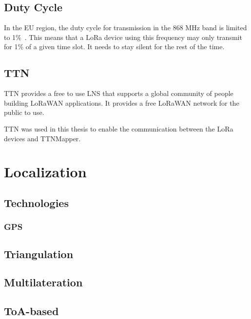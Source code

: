 \subsection{Duty Cycle}


In the \ac{EU} region, the duty cycle for transmission in the 868 MHz band is limited to 1\%~\cite{etsi_etsi_2012}.
This means that a \ac{LoRa} device using this frequency may only transmit for 1\% of a given time slot.
It needs to stay silent for the rest of the time.

\subsection{\acf{TTN}}

\ac{TTN} provides a free to use \ac{LNS} that supports a global community of people building \ac{LoRaWAN} applications.
It provides a free \ac{LoRaWAN} network for the public to use.

\ac{TTN} was used in this thesis to enable the communication between the \ac{LoRa} devices and TTNMapper.


\section{Localization}

\subsection{Technologies}

\subsubsection{\ac{GPS}}


\subsection{Triangulation}

\subsection{Multilateration}

\subsection{\acs{ToA}-based}

